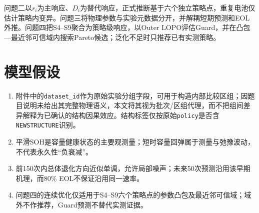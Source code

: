 \documentclass[withoutpreface]{cumcmthesis}
\begin{document}
问题二以$r_i$为主响应、$D_i$为替代响应，正式推断基于六个独立策略点，重复电池仅估计策略内变异。问题三将物理参数与实验元数据分开，并解耦短期预测和EOL外推。问题四把S4--S9聚合为策略级响应，以Outer LOPO评估Guard，并在凸包—最近邻可信域内搜索Pareto候选；泛化不足时只推荐已有实测策略。


\section{模型假设}
\begin{enumerate}[label=\textbf{A\arabic*.}]
  \item 附件中的\texttt{dataset\_id}作为原始实验分组字段，可用于构造内部比较区组；因题目说明未给出其完整物理语义，本文将其视为批次/区组代理，而不把组间差异解释为已确认的结构因果效应。结构标签仅按原始\texttt{policy}是否含\texttt{NEWSTRUCTURE}识别。
  \item 平滑SOH是容量健康状态的主要观测量；短时容量回弹属于测量与弛豫波动，不代表永久性“负衰减”。
  \item 前150次内总体退化方向近似单调，允许局部噪声；未来50次预测沿用该早期机理，而80\% EOL不保证沿用同一速率。
  \item 问题四的连续优化仅适用于S4--S9六个策略点的参数凸包及最近邻可信域；域外不作推荐，Guard预测不替代实测证据。
\end{enumerate}
\end{document}
